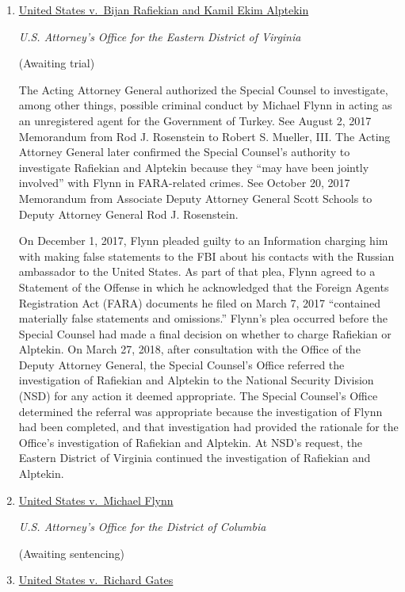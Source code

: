 \begin{enumerate}[1.]

\item \underline{United States v.\ Bijan Rafiekian and Kamil Ekim Alptekin}

\textit{U.S. Attorney's Office for the Eastern District of Virginia}

(Awaiting trial)

The Acting Attorney General authorized the Special Counsel to investigate, among other things, possible criminal conduct by Michael Flynn in acting as an unregistered agent for the Government of Turkey.
See August 2, 2017 Memorandum from Rod J. Rosenstein to Robert S. Mueller, III\null.
The Acting Attorney General later confirmed the Special Counsel's authority to investigate Rafiekian and Alptekin because they ``may have been jointly involved'' with Flynn in FARA-related crimes.
See October 20, 2017 Memorandum from Associate Deputy Attorney General Scott Schools to Deputy Attorney General Rod J. Rosenstein.

On December 1, 2017, Flynn pleaded guilty to an Information charging him with making false statements to the FBI about his contacts with the Russian ambassador to the United States.
As part of that plea, Flynn agreed to a Statement of the Offense in which he acknowledged that the Foreign Agents Registration Act (FARA) documents he filed on March 7, 2017 ``contained materially false statements and omissions.''
Flynn's plea occurred before the Special Counsel had made a final decision on whether to charge Rafiekian or Alptekin.
On March 27, 2018, after consultation with the Office of the Deputy Attorney General, the Special Counsel's Office referred the investigation of Rafiekian and Alptekin to the National Security Division (NSD) for any action it deemed appropriate.
The Special Counsel's Office determined the referral was appropriate because the investigation of Flynn had been completed, and that investigation had provided the rationale for the Office's investigation of Rafiekian and Alptekin.
At NSD's request, the Eastern District of Virginia continued the investigation of Rafiekian and Alptekin.

    \item \underline{United States v.\ Michael Flynn}

\textit{U.S. Attorney's Office for the District of Columbia}

(Awaiting sentencing)

    \item \underline{United States v.\ Richard Gates}


\end{enumerate}
